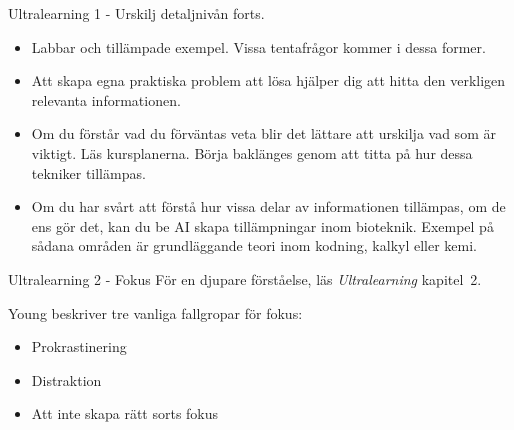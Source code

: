 \documentclass[presentation]{beamer}
\begin{document}
\begin{frame}{Ultralearning 1 - Urskilj detaljnivån forts.}

\begin{itemize}
    \item Labbar och tillämpade exempel. Vissa tentafrågor kommer i dessa former.
    \item Att skapa egna praktiska problem att lösa hjälper dig att hitta den verkligen relevanta informationen.
    \item Om du förstår vad du förväntas veta blir det lättare att urskilja vad som är viktigt. Läs kursplanerna. Börja baklänges genom att titta på hur dessa tekniker tillämpas.
    \item Om du har svårt att förstå hur vissa delar av informationen tillämpas, om de ens gör det, kan du be AI skapa tillämpningar inom bioteknik. Exempel på sådana områden är grundläggande teori inom kodning, kalkyl eller kemi.
\end{itemize}


\end{frame}

\begin{frame}{Ultralearning 2 - Fokus}
  För en djupare förståelse, läs \textit{Ultralearning} kapitel~2.

 Young beskriver tre vanliga fallgropar för fokus:
\begin{itemize}
    \item Prokrastinering
    \item Distraktion
    \item Att inte skapa rätt sorts fokus
\end{itemize}

\end{frame}
\end{document}
